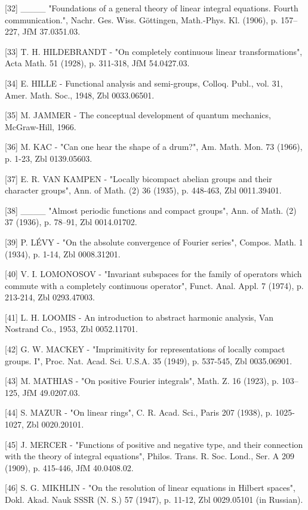 {[}32{]} \_\_\_\_ "Foundations of a general theory of linear integral equations. Fourth communication.", Nachr. Ges. Wiss. Göttingen, Math.-Phys. Kl. (1906), p. 157--227, JfM 37.0351.03.

{[}33{]} T. H. HILDEBRANDT - "On completely continuous linear transformations", Acta Math. 51 (1928), p. 311-318, JfM 54.0427.03.

{[}34{]} E. HILLE - Functional analysis and semi-groups, Colloq. Publ., vol. 31, Amer. Math. Soc., 1948, Zbl 0033.06501.

{[}35{]} M. JAMMER - The conceptual development of quantum mechanics, McGraw-Hill, 1966.

{[}36{]} M. KAC - "Can one hear the shape of a drum?", Am. Math. Mon. 73 (1966), p. 1-23, Zbl 0139.05603.

{[}37{]} E. R. VAN KAMPEN - "Locally bicompact abelian groups and their character groups", Ann. of Math. (2) 36 (1935), p. 448-463, Zbl 0011.39401.

{[}38{]} \_\_\_\_ "Almost periodic functions and compact groups", Ann. of Math. (2) 37 (1936), p. 78--91, Zbl 0014.01702.

{[}39{]} P. LÉVY - "On the absolute convergence of Fourier series", Compos. Math. 1 (1934), p. 1-14, Zbl 0008.31201.

{[}40{]} V. I. LOMONOSOV - "Invariant subspaces for the family of operators which commute with a completely continuous operator", Funct. Anal. Appl. 7 (1974), p. 213-214, Zbl 0293.47003.

{[}41{]} L. H. LOOMIS - An introduction to abstract harmonic analysis, Van Nostrand Co., 1953, Zbl 0052.11701.

{[}42{]} G. W. MACKEY - "Imprimitivity for representations of locally compact groups. I", Proc. Nat. Acad. Sci. U.S.A. 35 (1949), p. 537-545, Zbl 0035.06901.

{[}43{]} M. MATHIAS - "On positive Fourier integrals", Math. Z. 16 (1923), p. 103--125, JfM 49.0207.03.

{[}44{]} S. MAZUR - "On linear rings", C. R. Acad. Sci., Paris 207 (1938), p. 1025-1027, Zbl 0020.20101.

{[}45{]} J. MERCER - "Functions of positive and negative type, and their connection with the theory of integral equations", Philos. Trans. R. Soc. Lond., Ser. A 209 (1909), p. 415-446, JfM 40.0408.02.

{[}46{]} S. G. MIKHLIN - "On the resolution of linear equations in Hilbert spaces", Dokl. Akad. Nauk SSSR (N. S.) 57 (1947), p. 11-12, Zbl 0029.05101 (in Russian).

